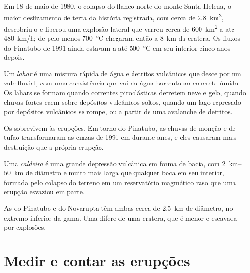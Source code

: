 Em 18 de maio de 1980, o colapso do flanco norte do monte Santa Helena, o maior
deslizamento de terra da história registrada, com cerca de \qty{2.8}{km^3}, descobriu o  e
liberou uma explosão lateral que varreu cerca de \qty{600}{km^2} a até
\qty{480}{km/h};  de pelo menos \qty{700}{\celsius} chegaram então a
\qty{8}{km} da cratera. Os fluxos do Pinatubo de 1991 ainda estavam a até
\qty{500}{\celsius} em seu interior cinco anos depois.

\begin{definition}[Lahar]\label{def:b2:eruptive-styles:lahar}
Um \emph{lahar} é uma mistura rápida de água e detritos vulcânicos
que desce por um vale fluvial, com uma consistência que vai da água barrenta
ao concreto úmido. Os lahars se formam quando correntes piroclásticas derretem neve e gelo, quando
chuvas fortes caem sobre depósitos vulcânicos soltos, quando um lago represado por depósitos
vulcânicos se rompe, ou a partir de uma avalanche de detritos.
\end{definition}

Os  sobrevivem às erupções. Em torno do Pinatubo, as chuvas de monção e de tufão transformaram
as cinzas de 1991 em  durante anos, e eles causaram mais destruição que a
própria erupção.

\begin{definition}[Caldeira]\label{def:b2:eruptive-styles:caldera}
Uma \emph{caldeira} é uma grande depressão vulcânica em forma de bacia,
com \qtyrange{2}{50}{km} de diâmetro e muito mais larga que qualquer boca em seu interior, formada pelo
colapso do terreno em um reservatório magmático raso que uma erupção
esvaziou em parte.
\end{definition}

As  do Pinatubo e do Novarupta têm ambas cerca de \qty{2.5}{km} de diâmetro, no
extremo inferior da gama. Uma  difere de uma cratera, que é menor e escavada por explosões.

\section{Medir e contar as erupções}

